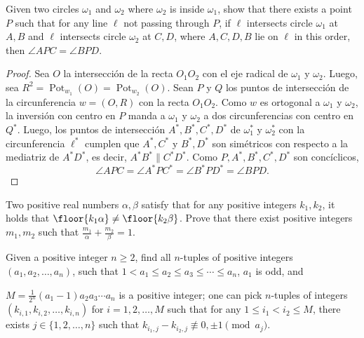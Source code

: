 \begin{probMG}
  Given two circles $\omega_1$ and $\omega_2$ where $\omega_2$ is inside
  $\omega_1$, show that there exists a point $P$ such that for any line $\ell$
  not passing through $P$, if $\ell$ intersects circle $\omega_1$ at $A,B$ and
  $\ell$ intersects circle $\omega_2$ at $C,D$, where $A,C,D,B$ lie on $\ell$ in
  this order, then $\angle APC=\angle BPD$.
\end{probMG}

\begin{proof}
  Sea $O$ la intersección de la recta $O_1O_2$ con el eje radical de $\omega_1$
  y $\omega_2$. Luego, sea
  $R^2=\operatorname{Pot}_{w_1}(O)=\operatorname{Pot}_{w_2}(O)$. Sean $P$ y $Q$
  los puntos de intersección de la circunferencia $w=(O,R)$ con la recta
  $O_1O_2$. Como $w$ es ortogonal a $\omega_1$ y $\omega_2$, la inversión con
  centro en $P$ manda a $\omega_1$ y $\omega_2$ a dos circunferencias con centro
  en $Q^*$. Luego, los puntos de intersección $A^*,B^*,C^*,D^*$ de $\omega_1^*$
  y $\omega_2^*$ con la circunferencia $\ell^*$ cumplen que $A^*,C^*$ y
  $B^*,D^*$ son simétricos con respecto a la mediatriz de $A^*D^*$, es decir,
  $A^*B^*\parallel C^*D^*$. Como $P,A^*,B^*,C^*,D^*$ son concíclicos,
  \[\angle APC=\angle A^*PC^*=\angle B^*PD^*=\angle BPD.\]
\end{proof}

\begin{probM}
  Two positive real numbers $\alpha,\beta$ satisfy that for any positive
  integers $k_1,k_2$, it holds that $\floor{k_1\alpha}\ne\floor{k_2\beta}$.
  Prove that there exist positive integers $m_1,m_2$ such that
  $\frac{m_1}{\alpha}+\frac{m_2}{\beta}=1$.
\end{probM}

\begin{probH}
  Given a positive integer $n\ge 2$, find all $n$-tuples of positive integers
  $(a_1,a_2,\dots,a_n)$, such that $1<a_1\le a_2\le a_3\le\cdots\le a_n$, $a_1$
  is odd, and
  \begin{enumerate}[(1)]
    \ii $M=\frac{1}{2^n}(a_1-1)a_2a_3\cdots a_n$ is a positive integer;
    \ii one can pick $n$-tuples of integers $(k_{i,1},k_{i,2},\dots,k_{i,n})$
    for $i=1,2,\dots,M$ such that for any $1\le i_1<i_2\le M$, there exists
    $j\in\{1,2,\dots,n\}$ such that
    $k_{i_1,j}-k_{i_2,j}\not\equiv 0,\pm 1\pmod{a_j}$.
  \end{enumerate}
\end{probH}

